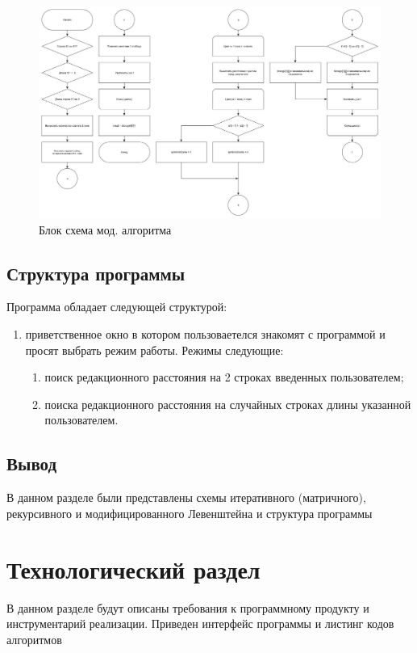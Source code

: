 \documentclass[a4paper, 14pt]{article}
\begin{document}
	\begin{figure}[!h]
		\centering
		\includegraphics[width=0.7\linewidth]{graph/2}
		\caption{Блок схема мод. алгоритма}
		\label{fig:2}
	\end{figure}
	
	

	\subsection{Структура программы}
	
	Программа обладает следующей структурой:
	
	\begin{enumerate}
		\item приветственное окно в котором пользоваетелся знакомят с программой и просят выбрать режим работы. Режимы следующие:
		\begin{enumerate}
			\item поиск редакционного расстояния на 2 строках введенных пользователем;
			\item поиска редакционного расстояния на случайных строках длины указанной пользователем.
		\end{enumerate}
	\end{enumerate}

	\subsection{Вывод}
	В данном разделе были представлены схемы итеративного (матричного), рекурсивного и модифицированного Левенштейна и структура программы 
	
	\newpage
	\section{Технологический раздел}
	
	В данном разделе будут описаны требования к программному продукту и инструментарий реализации. Приведен интерфейс программы и листинг кодов алгоритмов
	
\end{document}
